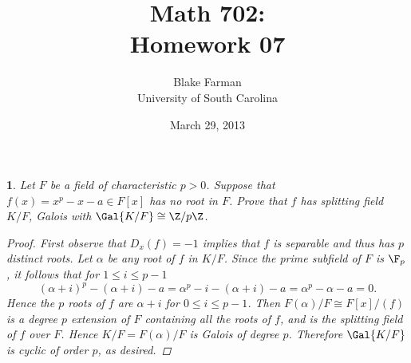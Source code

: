 \documentclass[10pt]{amsart}
\author{Blake Farman\\University of South Carolina}
\title{Math 702:\\Homework 07}
\date{March 29, 2013}
\begin{document}
\maketitle

\providecommand{\p}{\mathfrak{p}}
\providecommand{\m}{\mathfrak{m}}

\newtheorem{thm}{}
\newtheorem{lem}{Lemma}

\newcommand{\End}[2]{\operatorname{End}_{#1}\left(#2\right)}
\newcommand{\Hom}[2]{\operatorname{Hom}_{#1}\left(#2\right)}

\begin{thm}
  Let $F$ be a field of characteristic $p > 0$.
  Suppose that $f(x) = x^p - x - a \in F[x]$ has no root in $F$.
  Prove that $f$ has splitting field $K/F$, Galois with $\Gal{K/F} \cong \Z/p\Z$.

  \begin{proof}
    First observe that $D_x(f) = -1$ implies that $f$ is separable and thus has $p$ distinct roots.
    Let $\alpha$ be any root of $f$ in $K/F$.
    Since the prime subfield of $F$ is $\F_p$, it follows that for $1 \leq i \leq p-1$
    $$(\alpha + i)^p - (\alpha + i) - a = \alpha^p - i - (\alpha + i) - a = \alpha^p - \alpha - a = 0.$$
    Hence the $p$ roots of $f$ are $\alpha + i$ for $0 \leq i \leq p-1$.
    Then $F(\alpha)/F \cong F[x]/(f)$ is a degree $p$ extension of $F$ containing all the roots of $f$, and is the splitting field of $f$ over $F$.
    Hence $K/F = F(\alpha)/F$ is Galois of degree $p$.
    Therefore $\Gal{K/F}$ is cyclic of order $p$, as desired.
  \end{proof}
\end{thm}
\end{document}
